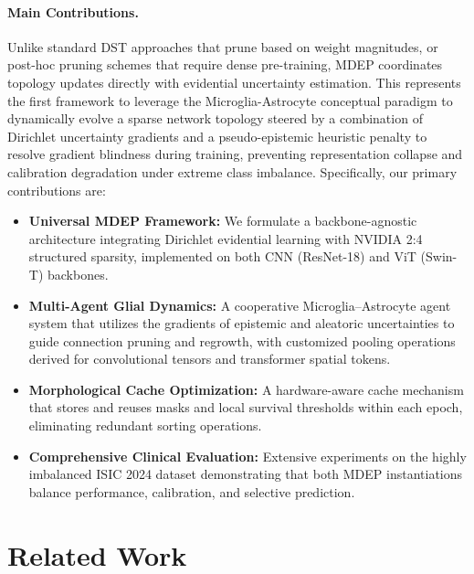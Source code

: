 \documentclass[letterpaper]{article} %
\begin{document}
\paragraph{Main Contributions.} Unlike standard DST approaches that prune based on weight magnitudes, or post-hoc pruning schemes that require dense pre-training, MDEP coordinates topology updates directly with evidential uncertainty estimation. This represents the first framework to leverage the Microglia-Astrocyte conceptual paradigm to dynamically evolve a sparse network topology steered by a combination of Dirichlet uncertainty gradients and a pseudo-epistemic heuristic penalty to resolve gradient blindness during training, preventing representation collapse and calibration degradation under extreme class imbalance. Specifically, our primary contributions are:
\begin{itemize}
    \item \textbf{Universal MDEP Framework:} We formulate a backbone-agnostic architecture integrating Dirichlet evidential learning with NVIDIA 2:4 structured sparsity, implemented on both CNN (ResNet-18) and ViT (Swin-T) backbones.
    \item \textbf{Multi-Agent Glial Dynamics:} A cooperative Microglia--Astrocyte agent system that utilizes the gradients of epistemic and aleatoric uncertainties to guide connection pruning and regrowth, with customized pooling operations derived for convolutional tensors and transformer spatial tokens.
    \item \textbf{Morphological Cache Optimization:} A hardware-aware cache mechanism that stores and reuses masks and local survival thresholds within each epoch, eliminating redundant sorting operations.
    \item \textbf{Comprehensive Clinical Evaluation:} Extensive experiments on the highly imbalanced ISIC 2024 dataset demonstrating that both MDEP instantiations balance performance, calibration, and selective prediction.
\end{itemize}

\section{Related Work}\label{sec:related}
\end{document}
